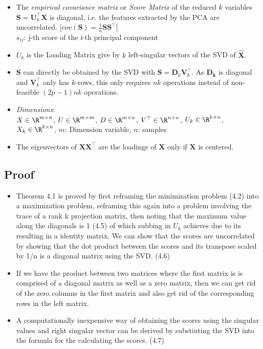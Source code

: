 \documentclass[english]{latex4ei/latex4ei_sheet}
\begin{document}
\begin{sectionbox}
\begin{itemize}
\item The \emph{empirical covariance matrix} or \emph{Score Matrix} of the reduced $k$ variables $\boldsymbol{S}=\boldsymbol{U}_k^{\top}\boldsymbol{X}$ is diagonal, i.e. the features extracted by the PCA are uncorrelated.       \hspace{20} [$cov(\boldsymbol{S})=\frac{1}{n}\boldsymbol{S}\boldsymbol{S}^{\top}$]\\
$s_{ij}$: j-th score of the i-th principal component
\item $U_k$ is the Loading Matrix give by $k$ left-singular vectors of the SVD of $\boldsymbol{\hat{X}}$.
\item $\boldsymbol{S}$ can directly be obtained by the SVD with $\boldsymbol{S}=\boldsymbol{D}_k\boldsymbol{V}_k^{\top}$. As $\boldsymbol{D_k}$ is diagonal and $\boldsymbol{V}_k^{\top}$ only has $k$-rows, this only requires $nk$ operations instead of non-feasible $(2p-1)nk$ operations.
\item \emph{Dimensions}:\\ $X\in\R^{m\times n}$, $U\in\R^{m\times m}$, $D\in\R^{m\times n}$, $V^{\top}\in\R^{n\times n}$, $U_k\in\R^{k\times n}$, $X_k\in\R^{k\times n}$, $m$: Dimension variable, $n$: samples
\item The eigenvectors of $\mathbf{X}\mathbf{X}^{\top}$ are the loadings of $\mathbf{X}$ only if $\mathbf{X}$ is centered.
\end{itemize}

\subsection{Proof}
\begin{itemize}
\item Theorem 4.1 is proved by first reframing the minimization problem (4.2) into a maximization problem, reframing this again into a problem involving the trace of a rank k projection matrix, then noting that the maximum value along the diagonals is 1 (4.5) of which subbing in $U_k$ achieves due to its resulting in a identity matrix.
We can show that the scores are uncorrelated by showing that the dot product between the scores and its transpose scaled by 1/n is a diagonal matrix using the SVD. (4.6)
\item If we have the product between two matrices where the first matrix is is comprised of a diagonal matrix as well as a zero matrix, then we can get rid of the zero columns in the first matrix and also get rid of the corresponding rows in the left matrix.
\item A computationally inexpensive way of obtaining the scores using the singular values and right singular vector can be derived by substiuting the SVD into the formula for the calculating the scores. (4.7)
\end{itemize}


\end{sectionbox}
\end{document}
